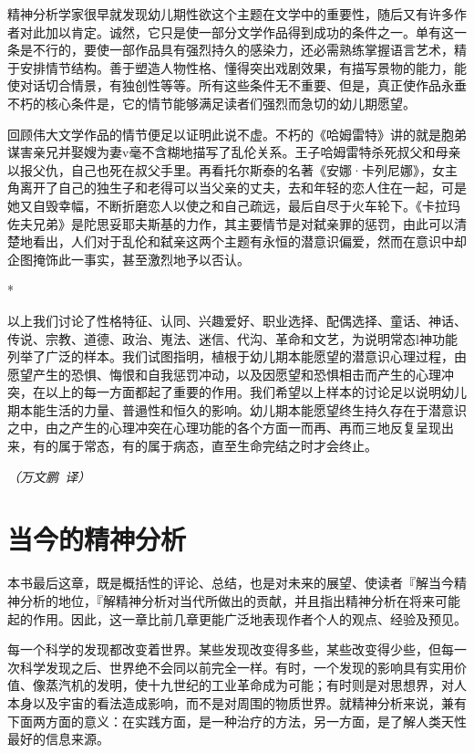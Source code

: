 \documentclass[UTF8,10pt,a4paper,openany]{book}
\newcommand{\signature}[1]{\begin{flushright}\slshape #1\end{flushright}}
\newcommand{\signatureD}{\signature{（万文鹏~译）}}
\begin{document}
精神分析学家很早就发现幼儿期性欲这个主题在文学中的重要性，随后又有许多作者对此加以肯定。诚然，它只是使一部分文学作品得到成功的条件之一。单有这一条是不行的，要使一部作品具有强烈持久的感染力，还必需熟练掌握语言艺术，精于安排情节结构。善于塑造人物性格、懂得突出戏剧效果，有描写景物的能力，能使对话切合情景，有独创性等等。所有这些条件无不重要、但是，真正使作品永垂不朽的核心条件是，它的情节能够满足读者们强烈而急切的幼儿期愿望。

回顾伟大文学作品的情节便足以证明此说不虚。不朽的《哈姆雷特》讲的就是胞弟谋害亲兄并娶嫂为妻v毫不含糊地描写了乱伦关系。王子哈姆雷特杀死叔父和母亲以报父仇，自己也死在叔父手里。再看托尔斯泰的名著《安娜·卡列尼娜》，女主角离开了自己的独生子和老得可以当父亲的丈夫，去和年轻的恋人住在一起，可是她又自毁幸幅，不断折磨恋人以使之和自己疏远，最后自尽于火车轮下。《卡拉玛佐夫兄弟》是陀思妥耶夫斯基的力作，其主要情节是对弑亲罪的惩罚，由此可以清楚地看出，人们对于乱伦和弑亲这两个主题有永恒的潜意识偏爱，然而在意识中却企图掩饰此一事实，甚至激烈地予以否认。

*

以上我们讨论了性格特征、认同、兴趣爱好、职业选择、配偶选择、童话、神话、传说、宗教、道德、政治、嵬法、迷信、代沟、革命和文艺，为说明常态l神功能列举了广泛的样本。我们试图指明，植根于幼儿期本能愿望的潜意识心理过程，由愿望产生的恐惧、悔恨和自我惩罚冲动，以及因愿望和恐惧相击而产生的心理冲突，在以上的每一方面都起了重要的作用。我们希望以上样本的讨论足以说明幼儿期本能生活的力量、普遢性和恒久的影响。幼儿期本能愿望终生持久存在于潜意识之中，由之产生的心理冲突在心理功能的各个方面一而再、再而三地反复呈现出来，有的属于常态，有的属于病态，直至生命完结之时才会终止。

\signatureD

\chapter{当今的精神分析}\label{10}

本书最后这章，既是概括性的评论、总结，也是对未来的展望、使读者『解当今精神分析的地位，『解精神分析对当代所做出的贡献，并且指出精神分析在将来可能起的作用。因此，这一章比前几章更能广泛地表现作者个人的观点、经验及预见。

每一个科学的发现都改变着世界。某些发现改变得多些，某些改变得少些，但每一次科学发现之后、世界绝不会同以前完全一样。有时，一个发现的影响具有实用价值、像蒸汽机的发明，使十九世纪的工业革命成为可能；有时则是对思想界，对人本身以及宇宙的看法造成影响，而不是对周围的物质世界。就精神分析来说，兼有下面两方面的意义：在实践方面，是一种治疗的方法，另一方面，是了解人类天性最好的信息来源。
\end{document}
